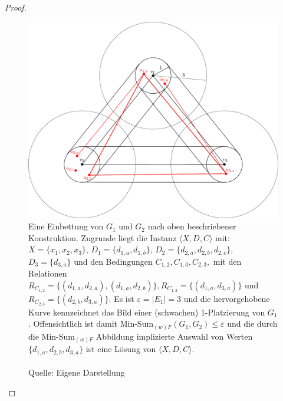 \documentclass[a4paper, 12pt, twoside]{article}
\theoremstyle{Format1} %
\begin{document}
\begin{proof}
\begin{figure}[H]
	\centering
	\includegraphics[width=\linewidth]{chapter_4_construction.pdf}
	\caption{
		Eine Einbettung von $G_1$ und $G_2$ nach oben beschriebener Konstruktion. Zugrunde liegt die Instanz $\langle X,D,C \rangle$ mit: $X=\{x_1,x_2,x_3\}$,
		$D_1=\{d_{1,a},d_{1,b}\}$, $D_2=\{d_{2,a},d_{2,b},d_{2,c}\}$, $D_3=\{d_{3,a}\}$ und den Bedingungen $C_{1,2},C_{1,3},C_{2,3},$ mit den Relationen
		$R_{C_{1,2}} = \{(d_{1,a},d_{2,a}),(d_{1,a},d_{2,b})\}, R_{C_{1,3}} = \{(d_{1,a},d_{3,a})\}$ und $R_{C_{2,3}} = \{(d_{2,b},d_{3,a})\}$.
		Es ist $\varepsilon = |E_1| = 3$ und die hervorgehobene Kurve kennzeichnet das Bild einer (schwachen) 1-Platzierung von $G_1$. Offensichtlich ist
		damit Min-Sum$_{(w)F}(G_1,G_2) \leq \varepsilon$ und die durch die Min-Sum$_{(w)F}$ Abbildung implizierte Auswahl von Werten
		$\{d_{1,a}, d_{2,b}, d_{3,a}\}$ ist eine Lösung von $\langle X,D,C \rangle$.
		\\
		\\
		Quelle: Eigene Darstellung
	}
	\label{chapter_4_construction}
\end{figure}


\end{proof}
\end{document}
